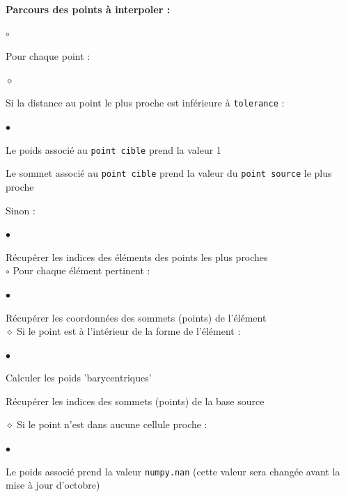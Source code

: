 \textbf{Parcours des points à interpoler :}
\begin{list}{$\circ$}{\leftmargin=0.5cm  \itemsep=0cm}
    \item Pour chaque point :
    \begin{list}{$\diamond$}{\leftmargin=0.5cm  \itemsep=0cm}
        \item Si la distance au point le plus proche est inférieure à \texttt{tolerance} :
        \begin{list}{$\bullet$}{\leftmargin=0.5cm \itemsep=0cm}
            \item Le poids associé au \texttt{point cible} prend la valeur 1
            \item Le sommet associé au \texttt{point cible} prend la valeur du \texttt{point source} le plus proche
        \end{list}
        \item Sinon :
        \begin{list}{$\bullet$}{\leftmargin=0.5cm  \itemsep=0cm}
            \item Récupérer les indices des éléments des points les plus proches\\
            $\circ$ Pour chaque élément pertinent :
            \begin{list}{$\bullet$}{\leftmargin=0.5cm \itemsep=0cm}
                \item Récupérer les coordonnées des sommets (points) de l'élément\\
                $\diamond$ Si le point est à l'intérieur de la forme de l'élément :
                \begin{list}{$\bullet$}{\leftmargin=0.5cm  \itemsep=0cm}
                    \item Calculer les poids 'barycentriques'
                    \item Récupérer les indices des sommets (points) de la base source
                \end{list}
            \end{list}
        \end{list}
    \end{list}
    $\diamond$ Si le point n'est dans aucune cellule proche :
    \begin{list}{$\bullet$}{\leftmargin=0.5cm  \itemsep=0cm}
        \item Le poids associé prend la valeur \texttt{numpy.nan} (cette valeur sera changée avant la mise à jour d'octobre)
    \end{list}
\end{list}

